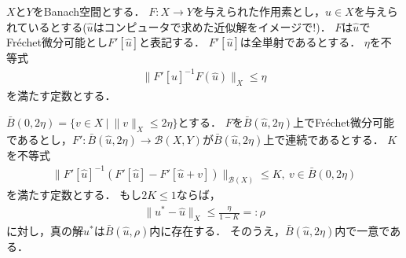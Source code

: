 \begin{Cor}\label{Cor:Kantorovich}
	$X$と$Y$をBanach空間とする．
	$F:X \rightarrow Y$を与えられた作用素とし，$\hat{u} \in X$を与えられているとする($\hat{u}$はコンピュータで求めた近似解をイメージで!)．
	$F$は$\hat{u}$でFr\'echet微分可能とし$F'[\hat{u}]$と表記する．
	$F'[\hat{u}]$は全単射であるとする．
	$\eta$を不等式
	\begin{align*}
	\| F'[\hat{u}]^{-1} F(\hat{u}) \|_{X} \le \eta
	\end{align*}
	を満たす定数とする．
	
	$\bar{B}(0, 2\eta )=\{ v \in X ~|~ \| v \|_{X} \le 2\eta \}$とする．
	$F$を$\bar{B}(\hat{u}, 2\eta)$上でFr\'echet微分可能であるとし，$F': \bar{B}(\hat{u}, 2\eta) \rightarrow {\mathcal B}(X, Y)$が$\bar{B}(\hat{u}, 2\eta)$上で連続であるとする．
	$K$を不等式
	\begin{align*}
	\| F'[\hat{u}]^{-1} \left( F'[\hat{u}] -  F'[\hat{u} + v] \right) \|_{{\mathcal B}(X)} \le K, ~ v \in \bar{B}\left( 0, 2\eta \right)
	\end{align*}
	を満たす定数とする．
	もし$2K \le 1$ならば，
	\begin{align*}
	\| u^* - \hat{u} \|_{X} \le \frac{ \eta }{1 - K} =: \rho
	\end{align*}
	に対し，真の解$u^*$は$\bar{B}(\hat{u}, \rho)$内に存在する．
	そのうえ，$\bar{B}(\hat{u}, 2\eta)$内で一意である．
\end{Cor}


%
